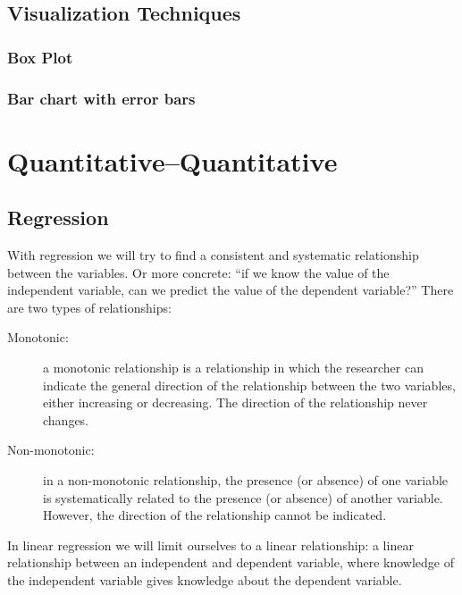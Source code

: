 \subsection{Visualization Techniques}
\label{ssec:qual-quant-visualization}

\subsubsection{Box Plot}


\subsubsection{Bar chart with error bars}


\section{Quantitative--Quantitative}


\subsection{Regression}
\label{sec:regression}

With regression we will try to find a consistent and systematic relationship between the variables. Or more concrete: ``if we know the value of the independent variable, can we predict the value of the dependent variable?'' There are two types of relationships:

\begin{description}
  \item [Monotonic:] a monotonic relationship is a relationship in which the researcher can indicate the general direction of the relationship between the two variables, either increasing or decreasing. The direction of the relationship never changes.
  \item[Non-monotonic:] in a non-monotonic relationship, the presence (or absence) of one variable is systematically related to the presence (or absence) of another variable. However, the direction of the relationship cannot be indicated.
\end{description}

In linear regression we will limit ourselves to a linear relationship: a linear relationship between an independent and dependent variable, where knowledge of the independent variable gives knowledge about the dependent variable.

